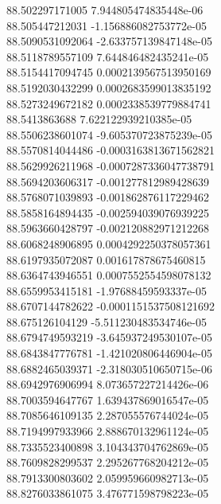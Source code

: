 {88.502297171005 7.944805474835448e-06 \\
88.505447212031 -1.156886082753772e-05 \\
88.5090531092064 -2.633757139847148e-05 \\
88.5118789557109 7.644846482435241e-05 \\
88.5154417094745 0.0002139567513950169 \\
88.5192030432299 0.0002683599013835192 \\
88.5273249672182 0.0002338539779884741 \\
88.5413863688 7.622122939210385e-05 \\
88.5506238601074 -9.605370723875239e-05 \\
88.5570814044486 -0.0003163813671562821 \\
88.5629926211968 -0.0007287336047738791 \\
88.5694203606317 -0.001277812989428639 \\
88.5768071039893 -0.001862876117229462 \\
88.5858164894435 -0.002594039076939225 \\
88.5963660428797 -0.002120882971212268 \\
88.6068248906895 0.0004292250378057361 \\
88.6197935072087 0.001617878675460815 \\
88.6364743946551 0.0007552554598078132 \\
88.6559953415181 -1.97688459593337e-05 \\
88.6707144782622 -0.0001151537508121692 \\
88.675126104129 -5.511230483534746e-05 \\
88.6794749593219 -3.645937249530107e-05 \\
88.6843847776781 -1.421020806446904e-05 \\
88.6882465039371 -2.318030510650715e-06 \\
88.6942976906994 8.073657227214426e-06 \\
88.7003594647767 1.639437869016547e-05 \\
88.7085646109135 2.287055576744024e-05 \\
88.7194997933966 2.888670132961124e-05 \\
88.7335523400898 3.104343704762869e-05 \\
88.7609828299537 2.295267768204212e-05 \\
88.7913300803602 2.059959660982713e-05 \\
88.8276033861075 3.476771598798223e-05 \\
}
